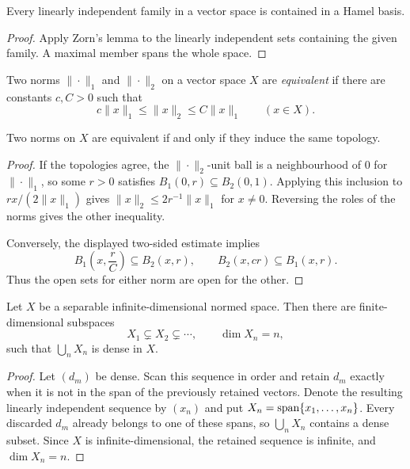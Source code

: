 \begin{notelemma}
Every linearly independent family in a vector space is contained in a Hamel
basis.
\end{notelemma}

\begin{proof}
Apply Zorn's lemma to the linearly independent sets containing the given
family.  A maximal member spans the whole space.
\end{proof}

\begin{notedefinition}
Two norms $\|\cdot\|_1$ and $\|\cdot\|_2$ on a vector space $X$ are
\emph{equivalent} if there are constants $c,C>0$ such that
\[
  c\|x\|_1\le\|x\|_2\le C\|x\|_1
  \qquad(x\in X).
\]
\end{notedefinition}

\begin{notetheorem}
Two norms on $X$ are equivalent if and only if they induce the same topology.
\end{notetheorem}

\begin{proof}
If the topologies agree, the $\|\cdot\|_2$-unit ball is a neighbourhood of
$0$ for $\|\cdot\|_1$, so some $r>0$ satisfies
$B_1(0,r)\subseteq B_2(0,1)$.  Applying this inclusion to
$rx/(2\|x\|_1)$ gives
$\|x\|_2\le 2r^{-1}\|x\|_1$ for $x\ne0$.  Reversing the roles of the
norms gives the other inequality.

Conversely, the displayed two-sided estimate implies
\[
  B_1\!\left(x,\frac rC\right)\subseteq B_2(x,r),
  \qquad
  B_2(x,cr)\subseteq B_1(x,r).
\]
Thus the open sets for either norm are open for the other.
\end{proof}

\begin{notetheorem}
Let $X$ be a separable infinite-dimensional normed space.  Then there are
finite-dimensional subspaces
\[
  X_1\subsetneq X_2\subsetneq\cdots,
  \qquad \dim X_n=n,
\]
such that $\bigcup_nX_n$ is dense in $X$.
\end{notetheorem}

\begin{proof}
Let $(d_m)$ be dense.  Scan this sequence in order and retain $d_m$ exactly
when it is not in the span of the previously retained vectors.  Denote the
resulting linearly independent sequence by $(x_n)$ and put
$X_n=\operatorname{span}\{x_1,\ldots,x_n\}$.  Every discarded $d_m$ already belongs to
one of these spans, so $\bigcup_nX_n$ contains a dense subset.  Since $X$ is
infinite-dimensional, the retained sequence is infinite, and
$\dim X_n=n$.
\end{proof}

